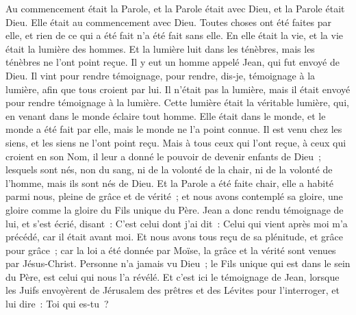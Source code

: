 \begin{multicols}{2}
\VerseOne{}Au commencement était la Parole, et la Parole était avec Dieu, et la Parole était Dieu.
Elle était au commencement avec Dieu.
Toutes choses ont été faites par elle, et rien de ce qui a été fait n'a été fait sans elle.
En elle était la vie, et la vie était la lumière des hommes.
Et la lumière luit dans les ténèbres, mais les ténèbres ne l'ont point reçue.
Il y eut un homme appelé Jean, qui fut envoyé de Dieu.
Il vint pour rendre témoignage, pour rendre, dis-je, témoignage à la lumière, afin que tous croient par lui.
Il n'était pas la lumière, mais il était envoyé pour rendre témoignage à la lumière.
Cette lumière était la véritable lumière, qui, en venant dans le monde éclaire tout homme.
Elle était dans le monde, et le monde a été fait par elle, mais le monde ne l'a point connue.
Il est venu chez les siens, et les siens ne l'ont point reçu.
Mais à tous ceux qui l'ont reçue, à ceux qui croient en son Nom, il leur a donné le pouvoir de devenir enfants de Dieu~;
lesquels sont nés, non du sang, ni de la volonté de la chair, ni de la volonté de l'homme, mais ils sont nés de Dieu.
Et la Parole a été faite chair, elle a habité parmi nous, pleine de grâce et de vérité~; et nous avons contemplé sa gloire, une gloire comme la gloire du Fils unique du Père.
Jean a donc rendu témoignage de lui, et s'est écrié, disant~: C'est celui dont j'ai dit~: Celui qui vient après moi m'a précédé, car il était avant moi.
Et nous avons tous reçu de sa plénitude, et grâce pour grâce~;
car la loi a été donnée par Moïse, la grâce et la vérité sont venues par Jésus-Christ.
Personne n'a jamais vu Dieu~; le Fils unique qui est dans le sein du Père, est celui qui nous l'a révélé.
Et c'est ici le témoignage de Jean, lorsque les Juifs envoyèrent de Jérusalem des prêtres et des Lévites pour l'interroger, et lui dire~: Toi qui es-tu~?

\end{multicols}
